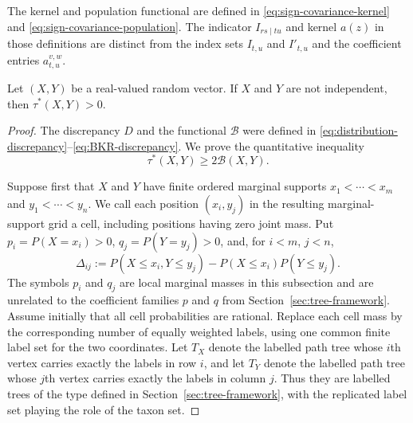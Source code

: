 \documentclass[12pt]{article}
\begin{document}
The kernel and population functional are defined in
\eqref{eq:sign-covariance-kernel} and
\eqref{eq:sign-covariance-population}.  The indicator $I_{rs\mid tu}$
and kernel $a(z)$ in those definitions are distinct from the index sets
$I_{t,u}$ and $I'_{t,u}$ and the coefficient entries $a_{t,u}^{v,w}$.

\begin{corollary}\label{cor:tau-star}
Let $(X,Y)$ be a real-valued random vector.  If $X$ and $Y$ are not
independent, then $\tau^*(X,Y)>0$.
\end{corollary}

\begin{proof}
The discrepancy $D$ and the functional $\mathcal B$ were defined in
\eqref{eq:distribution-discrepancy}--\eqref{eq:BKR-discrepancy}.
We prove the quantitative inequality
\begin{equation}\label{eq:tau-star-BKR-lower-bound}
\tau^*(X,Y)\ge2\mathcal B(X,Y).
\end{equation}

Suppose first that $X$ and $Y$ have finite ordered marginal supports
$x_1<\cdots<x_m$ and $y_1<\cdots<y_n$.
We call each position $(x_i,y_j)$ in the resulting marginal-support grid a cell,
including positions having zero joint mass.
Put $p_i=P(X=x_i)>0$, $q_j=P(Y=y_j)>0$, and, for $i<m$, $j<n$,
\begin{equation}\label{eq:finite-cdf-discrepancy}
\Delta_{ij}:=P(X\le x_i,Y\le y_j)-P(X\le x_i)P(Y\le y_j).
\end{equation}
The symbols $p_i$ and $q_j$ are local marginal masses in this subsection and
are unrelated to the coefficient families $p$ and $q$ from
Section~\ref{sec:tree-framework}.
Assume initially that all cell probabilities are rational.  Replace
each cell mass by the corresponding number of equally weighted labels, using
one common finite label set for the two coordinates.  Let $T_X$ denote the
labelled path tree whose $i$th vertex carries exactly the labels in row $i$,
and let $T_Y$ denote the labelled path tree whose $j$th vertex carries exactly
the labels in column $j$.  Thus they are labelled trees of the type defined in
Section~\ref{sec:tree-framework}, with the replicated label set playing the
role of the taxon set.


\end{proof}
\end{document}
